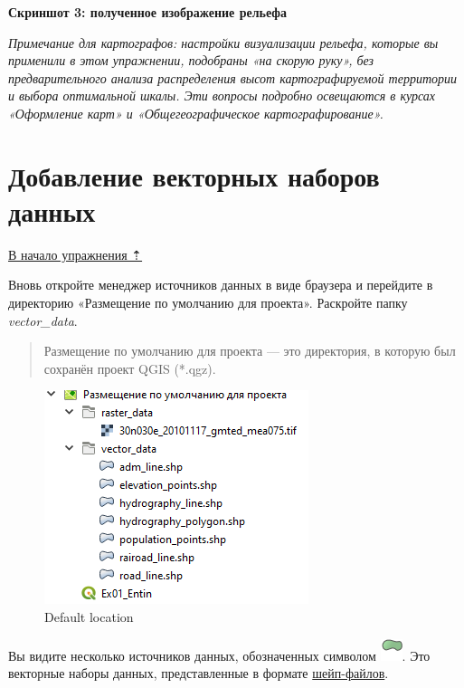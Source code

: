 \documentclass[
  12pt,
]{book}
\begin{document}
\textbf{Скриншот 3: полученное изображение рельефа}

\emph{Примечание для картографов: настройки визуализации рельефа, которые вы применили в этом упражнении, подобраны «на скорую руку», без предварительного анализа распределения высот картографируемой территории и выбора оптимальной шкалы. Эти вопросы подробно освещаются в курсах «Оформление карт» и «Общегеографическое картографирование».}

\hypertarget{map-design-general-vector}{%
\section{Добавление векторных наборов данных}\label{map-design-general-vector}}

\protect\hyperlink{map-design-general}{В начало упражнения ⇡}

Вновь откройте менеджер источников данных в виде браузера и перейдите в директорию «Размещение по умолчанию для проекта». Раскройте папку \emph{vector\_data}.

\begin{quote}
Размещение по умолчанию для проекта --- это директория, в которую был сохранён проект QGIS (*.qgz).
\end{quote}

\begin{figure}
\centering
\includegraphics{images/Ex01/DefaultLocation.png}
\caption{Default location}
\end{figure}

Вы видите несколько источников данных, обозначенных символом \includegraphics{images/Ex01/polygon.png}. Это векторные наборы данных, представленные в формате \href{https://desktop.arcgis.com/ru/arcmap/latest/manage-data/shapefiles/what-is-a-shapefile.htm}{шейп-файлов}.
\end{document}
